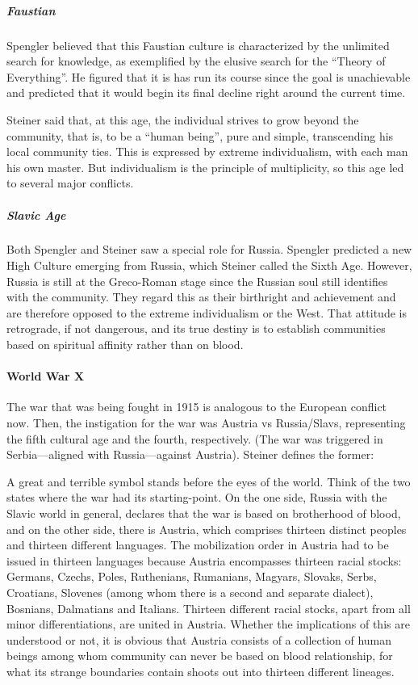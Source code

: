 \subparagraph{Faustian}


Spengler believed that this Faustian culture is characterized by the unlimited search for knowledge, as exemplified by the elusive search for the ``Theory of Everything''. He figured that it is has run its course since the goal is unachievable and predicted that it would begin its final decline right around the current time.

Steiner said that, at this age, the individual strives to grow beyond the community, that is, to be a ``human being'', pure and simple, transcending his local community ties. This is expressed by extreme individualism, with each man his own master. But individualism is the principle of multiplicity, so this age led to several major conflicts.

\subparagraph{Slavic Age}


Both Spengler and Steiner saw a special role for Russia. Spengler predicted a new High Culture emerging from Russia, which Steiner called the Sixth Age. However, Russia is still at the Greco-Roman stage since the Russian soul still identifies with the community. They regard this as their birthright and achievement and are therefore opposed to the extreme individualism or the West. That attitude is retrograde, if not dangerous, and its true destiny is to establish communities based on spiritual affinity rather than on blood.

\paragraph{World War X}


The war that was being fought in 1915 is analogous to the European conflict now. Then, the instigation for the war was Austria vs Russia/Slavs, representing the fifth cultural age and the fourth, respectively. (The war was triggered in Serbia---aligned with Russia---against Austria). Steiner defines the former:

\begin{quotex}
A great and terrible symbol stands before the eyes of the world. Think of the two states where the war had its starting-point. On the one side, Russia with the Slavic world in general, declares that the war is based on brotherhood of blood, and on the other side, there is Austria, which comprises thirteen distinct peoples and thirteen different languages. The mobilization order in Austria had to be issued in thirteen languages because Austria encompasses thirteen racial stocks: Germans, Czechs, Poles, Ruthenians, Rumanians, Magyars, Slovaks, Serbs, Croatians, Slovenes (among whom there is a second and separate dialect), Bosnians, Dalmatians and Italians. Thirteen different racial stocks, apart from all minor differentiations, are united in Austria. Whether the implications of this are understood or not, it is obvious that Austria consists of a collection of human beings among whom community can never be based on blood relationship, for what its strange boundaries contain shoots out into thirteen different lineages.
\end{quotex}


